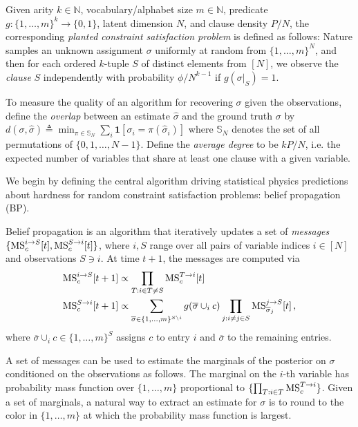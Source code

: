 \begin{definition}\label{def:plantedcsp}
    Given arity $k\in\mathbb{N}$, vocabulary/alphabet size $m\in\mathbb{N}$, predicate $g: \{1,\ldots,m\}^k \to \{0,1\}$, latent dimension $N$, and clause density $P/N$, the corresponding \emph{planted constraint satisfaction problem} is defined as follows: Nature samples an unknown assignment $\sigma$ uniformly at random from $\{ 1, \ldots, m \}^N$, and then for each ordered $k$-tuple $S$ of distinct elements from $[N]$, we observe the \emph{clause} $S$ independently with probability $\phi / N^{k-1}$ if $g(\sigma|_S) = 1$.

    To measure the quality of an algorithm for recovering $\sigma$ given the observations, define the \emph{overlap} between an estimate $\hat{\sigma}$ and the ground truth $\sigma$ by $d(\sigma,\hat{\sigma}) \triangleq \min_{\pi\in\mathbb{S}_N} \sum_i \mathbf{1}[\sigma_i = \pi(\hat{\sigma}_i)]$ where $\mathbb{S}_N$ denotes the set of all permutations of $\{0, 1, \ldots, N-1\}$. Define the \emph{average degree} to be $kP/N$, i.e. the expected number of variables that share at least one clause with a given variable.
\end{definition}

We begin by defining the central algorithm driving statistical physics predictions about hardness for random constraint satisfaction problems: belief propagation (BP).



\begin{definition}\label{def:BP}
    Belief propagation is an algorithm that iteratively updates a set of \emph{messages} $\{\textrm{MS}^{i\to S}_c[t], \textrm{MS}^{S\to i}_c[t]\}$, where $i, S$ range over all pairs of variable indices $i\in[N]$ and observations $S\ni i$. At time $t+1$, the messages are computed via
    \begin{align}
        \textrm{MS}^{i\to S}_c[t+1] &\propto \prod_{T: i\in T\neq S} \textrm{MS}^{T\to i}_c[t] \\
        \textrm{MS}^{S\to i}_c[t+1] & \propto \sum_{\overline{\sigma}\in \{ 1,\ldots,m \}^{S\backslash i}} g(\overline{\sigma}\cup_i c) \prod_{j: i\neq j\in S} \textrm{MS}^{j\to S}_{\overline{\sigma}_j}[t]\,,
    \end{align}
    where $\overline{\sigma}\cup_i c \in \{1, \ldots, m \}^S$ assigns $c$ to entry $i$ and $\overline{\sigma}$ to the remaining entries.

    A set of messages can be used to estimate the marginals of the posterior on $\sigma$ conditioned on the observations as follows. The marginal on the $i$-th variable has probability mass function over $\{1, \ldots, m\}$ proportional to $\{\prod_{T: i\in T} \textrm{MS}^{T\to i}_c\}$. Given a set of marginals, a natural way to extract an estimate for $\sigma$ is to round to the color in $\{1, \ldots, m\}$ at which the probability mass function is largest.
\end{definition}

